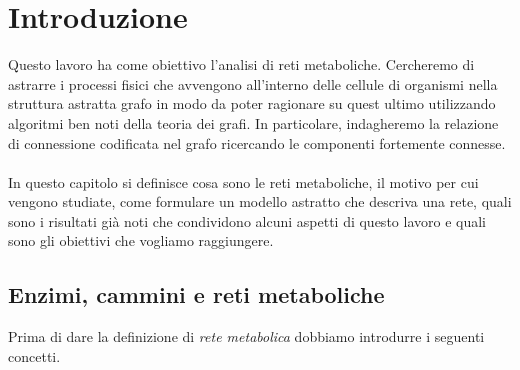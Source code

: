 \chapter{Introduzione}
\label{chapter:introduction}

Questo lavoro ha come obiettivo l'analisi di reti
metaboliche. Cercheremo di astrarre i processi fisici che avvengono
all'interno delle cellule di organismi nella struttura astratta grafo
in modo da poter ragionare su quest ultimo utilizzando algoritmi ben
noti della teoria dei grafi. In particolare, indagheremo la relazione
di connessione codificata nel grafo ricercando le componenti
fortemente connesse.
\\\\
In questo capitolo si definisce cosa sono le reti metaboliche, il
motivo per cui vengono studiate, come formulare un modello astratto che
descriva una rete, quali sono i risultati gi\`a noti che condividono
alcuni aspetti di questo lavoro e quali sono gli obiettivi che
vogliamo raggiungere.




\section{Enzimi, cammini e reti metaboliche}

Prima di dare la definizione di \emph{rete metabolica} dobbiamo
introdurre i seguenti concetti.

